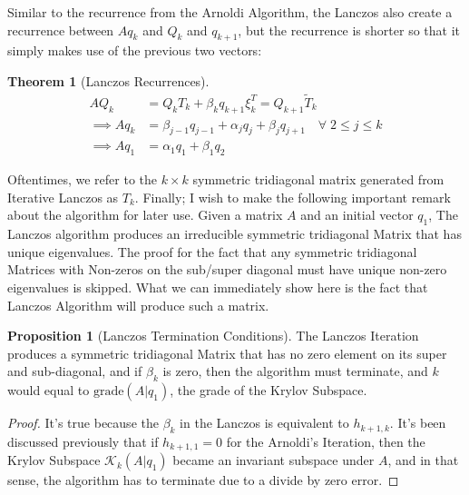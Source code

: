 \documentclass[]{article}
\theoremstyle{definition}
\newtheorem{theorem}{Theorem}            %
\newtheorem{prop}{Proposition}[section]  %
\begin{document}
            Similar to the recurrence from the Arnoldi Algorithm, the Lanczos also create a recurrence between $Aq_k$ and $Q_k$ and $q_{k + 1}$, but the recurrence is shorter so that it simply makes use of the previous two vectors: 
            \begin{theorem}[Lanczos Recurrences]
                \begin{align}
                    AQ_k &= Q_kT_k + \beta_k q_{k + 1}\xi_k^T = Q_{k + 1}\tilde{T}_k
                    \\
                    \implies Aq_k
                    &= \beta_{j - 1}q_{j - 1} + \alpha_j q_j + \beta_{j}q_{j + 1} \quad \forall\; 2\le j\le k
                    \\
                    \implies Aq_1 &= \alpha_1q_1 + \beta_1 q_2
                \end{align}    
            \end{theorem}
            \par
            Oftentimes, we refer to the $k\times k$ symmetric tridiagonal matrix generated from Iterative Lanczos as $T_k$. Finally; I wish to make the following important remark about the algorithm for later use. Given a matrix $A$ and an initial vector $q_1$, The Lanczos algorithm produces an irreducible symmetric tridiagonal Matrix that has unique eigenvalues. The proof for the fact that any symmetric tridiagonal Matrices with Non-zeros on the sub/super diagonal must have unique non-zero eigenvalues is skipped. What we can immediately show here is the fact that Lanczos Algorithm will produce such a matrix. 
            \begin{prop}[Lanczos Termination Conditions]\label{prop:Lanczos_Termination_Conditions}
                The Lanczos Iteration produces a symmetric tridiagonal Matrix that has no zero element on its super and sub-diagonal, and if $\beta_k$ is zero, then the algorithm must terminate, and $k$ would equal to $\text{grade}(A|q_1)$, the grade of the Krylov Subspace. 
            \end{prop}
            \begin{proof}
                It's true because the $\beta_{k}$ in the Lanczos is equivalent to $h_{k + 1, k}$. It's been discussed previously that if $h_{k + 1, 1} = 0$ for the Arnoldi's Iteration, then the Krylov Subspace $\mathcal K_k(A|q_1)$ became an invariant subspace under $A$, and in that sense, the algorithm has to terminate due to a divide by zero error. 
            \end{proof}
\end{document}
